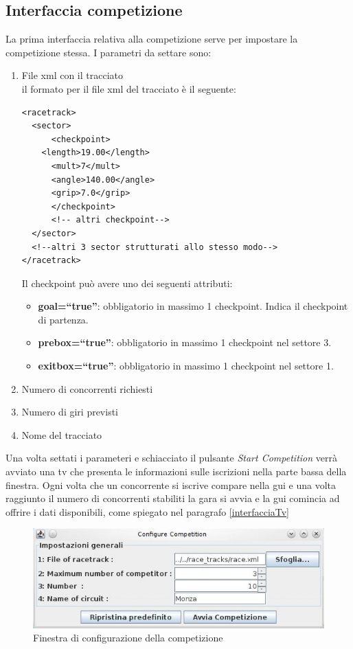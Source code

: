 \subsection{Interfaccia competizione}
La prima interfaccia relativa alla competizione serve per impostare la competizione stessa. I parametri da settare sono:
\begin{enumerate}
\item File xml con il tracciato\\
il formato per il file xml del tracciato \`{e} il seguente:
\begin{lstlisting}
<racetrack>
  <sector>
      <checkpoint>
	<length>19.00</length>
	  <mult>7</mult>
	  <angle>140.00</angle>
	  <grip>7.0</grip>
      </checkpoint>
      <!-- altri checkpoint-->
  </sector>
  <!--altri 3 sector strutturati allo stesso modo-->
</racetrack>
\end{lstlisting}
Il checkpoint pu\`{o} avere uno dei seguenti attributi:
\begin{itemize}
\item \textbf{goal=``true''}: obbligatorio in massimo 1 checkpoint. Indica il checkpoint di partenza.
\item \textbf{prebox=``true''}: obbligatorio in massimo 1 checkpoint nel settore 3.
\item \textbf{exitbox=``true''}: obbligatorio in massimo 1 checkpoint nel settore 1.
\end{itemize}
\item Numero di concorrenti richiesti
\item Numero di giri previsti
\item Nome del tracciato
\end{enumerate}
Una volta settati i parameteri e schiacciato il pulsante \emph{Start Competition} verr\`{a} avviato una tv che presenta le informazioni sulle iscrizioni nella parte bassa della finestra. Ogni volta che un concorrente si iscrive compare nella gui e una volta raggiunto il numero di concorrenti stabiliti la gara si avvia e la gui comincia ad offrire i dati disponibili, come spiegato nel paragrafo \ref{interfacciaTv}
\begin{center}
\begin{figure}[H]
	\includegraphics[scale=0.75]{img/ScreenshotRelazione/configureCompetition.jpg}
	\caption{Finestra di configurazione della competizione}
\end{figure}
\end{center}
